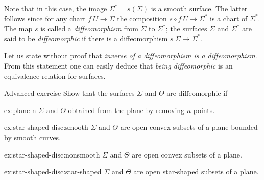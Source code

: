 Note that in this case, the image $\Sigma^{*}=s(\Sigma)$ is a smooth surface.
The latter follows since for any chart $f\:U\to \Sigma$ the composition $s\circ f\:U\to \Sigma^{*}$ is a chart of $\Sigma^{*}$. 
The map $s$ is called a \emph{diffeomorphism} from $\Sigma$ to $\Sigma^{*}$;
the surfaces $\Sigma$ and $\Sigma^{*}$ are said to be {}\emph{diffeomorphic} if there is a diffeomorphism $s\:\Sigma\to\Sigma^{*}$.

Let us state without proof that \textit{inverse of a diffeomorphism is a diffeomorphism}.
From this statement one can easily deduce that \textit{being diffeomorphic} is an equivalence relation for surfaces.

\begin{thm}{Advanced exercise}\label{ex:star-shaped-disc}
Show that the surfaces $\Sigma$ and $\Theta$ are diffeomorphic if

\begin{subthm}{ex:plane-n}
$\Sigma$ and $\Theta$ obtained from the plane by removing $n$ points.
\end{subthm}


\begin{subthm}{ex:star-shaped-disc:smooth}
$\Sigma$ and $\Theta$ are open convex subsets of a plane bounded by smooth curves.
\end{subthm}


\begin{subthm}{ex:star-shaped-disc:nonsmooth}
$\Sigma$ and $\Theta$ are open convex subsets of a plane.
\end{subthm}

\begin{subthm}{ex:star-shaped-disc:star-shaped}
$\Sigma$ and $\Theta$ are open star-shaped subsets of a plane.
\end{subthm}
\end{thm}

